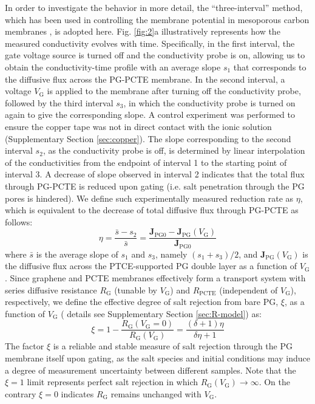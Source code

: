 \documentclass[journal=langd5,email=true, hyperref=true, keywords=false]{achemso}
\begin{document}
In order to investigate the behavior in more detail, the ``three-interval'' method, which has been used
in controlling the membrane potential in mesoporous carbon membranes
\cite{Surwade_2014}, is adopted here. Fig. \ref{fig:2}a
illustratively represents how the measured conductivity evolves with
time. Specifically, in the first interval, the gate voltage source is
turned off and the conductivity probe is on, allowing us to obtain the
conductivity-time profile with an average slope $s_{1}$ that
corresponds to the diffusive flux across the PG-PCTE membrane. In the
second interval, a voltage $V_{\mathrm{G}}$ is applied to the membrane
after turning off the conductivity probe, followed by the third
interval $s_{3}$, in which the conductivity probe is turned on again
to give the corresponding slope. A control experiment was performed to
ensure the copper tape was not in direct contact with the ionic
solution (Supplementary Section \ref{sec:copper}). The slope
corresponding to the second interval $s_{2}$, as the conductivity
probe is off, is determined by linear interpolation of the
conductivities from the endpoint of interval 1 to the starting point
of interval 3. A decrease of slope observed in interval 2 indicates
that the total flux through PG-PCTE is reduced upon gating (i.e. salt
penetration through the PG pores is hindered). We define such
experimentally measured reduction rate as $\eta$, which is equivalent
to the decrease of total diffusive flux through PG-PCTE as follows:
\begin{equation}
  \label{eq:rejection}
  \eta = \frac{\bar{s} - s_{2}}{\bar{s}} = \frac{\boldsymbol{J}_{\mathrm{PG0}}
    - \boldsymbol{J}_{\mathrm{PG}}(V_{\mathrm{G}})}{\boldsymbol{J}_{\mathrm{PG0}}}
\end{equation}
where $\bar{s}$ is the average slope of $s_{1}$ and $s_{3}$, namely
$(s_{1} + s_{3})/2$, and
$\boldsymbol{J}_{\mathrm{PG}}(V_{\mathrm{G}})$ is the diffusive flux
across the PTCE-supported PG double layer as a function of
$V_{\mathrm{G}}$. Since graphene and PCTE membranes effectively form a
transport system with series diffusive resistance $R_{\mathrm{G}}$
(tunable by $V_{\mathrm{G}}$) and $R_{\mathrm{PCTE}}$ (independent of
$V_{\mathrm{G}}$), respectively, we define the effective degree of
salt rejection from bare PG, $\xi$, as a function of $V_{\mathrm{G}}$ (
details see Supplementary Section \ref{sec:R-model}) as:
\begin{equation}
\label{eq:xi-def}
\xi = 1 - \frac{R_{\mathrm{G}}(V_{\mathrm{G}}=0)}{R_{\mathrm{G}}(V_{\mathrm{G}})} = \frac{(\delta+1) \eta}{\delta \eta + 1}
\end{equation}
The factor $\xi$ is a reliable and stable measure of salt rejection
through the PG membrane itself upon gating, as the salt species and
initial conditions may induce a degree of measurement uncertainty
between different samples. Note that the $\xi=1$ limit represents
perfect salt rejection in which
$R_{\mathrm{G}}(V_{\mathrm{G}}) \to \infty$. On the contrary $\xi=0$
indicates $R_{\mathrm{G}}$ remains unchanged with $V_{\mathrm{G}}$.
\end{document}
